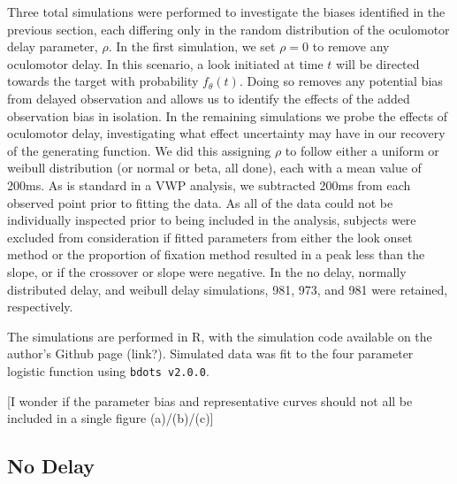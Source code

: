 \documentclass{article}
\newcommand{\xt}{\texttt}%
\begin{document}
Three total simulations were performed to investigate the biases identified in the previous section, each differing only in the random distribution of the oculomotor delay parameter, $\rho$. In the first simulation, we set $\rho = 0$ to remove any oculomotor delay. In this scenario, a look initiated at time $t$ will be directed towards the target with probability $f_{\theta}(t)$. Doing so removes any potential bias from delayed observation and allows us to identify the effects of the added observation bias in isolation. In the remaining simulations we probe the effects of oculomotor delay, investigating what effect uncertainty may have in our recovery of the generating function. We did this assigning $\rho$ to follow either a uniform or weibull distribution (or normal or beta, all done), each with a mean value of 200ms. As is standard in a VWP analysis, we subtracted 200ms from each observed point prior to fitting the data. As all of the data could not be individually inspected prior to being included in the analysis, subjects were excluded from consideration if fitted parameters from either the look onset method or the proportion of fixation method resulted in a peak less than the slope, or if the crossover or slope were negative. In the no delay, normally distributed delay, and weibull delay simulations, 981, 973, and 981 were retained, respectively.

The simulations are performed in R, with the simulation code available on the author's Github page (link?). Simulated data was fit to the four parameter logistic function using \xt{bdots v2.0.0}.

[I wonder if the parameter bias and representative curves should not all be included in a single figure (a)/(b)/(c)]

\subsection{No Delay}
\end{document}
